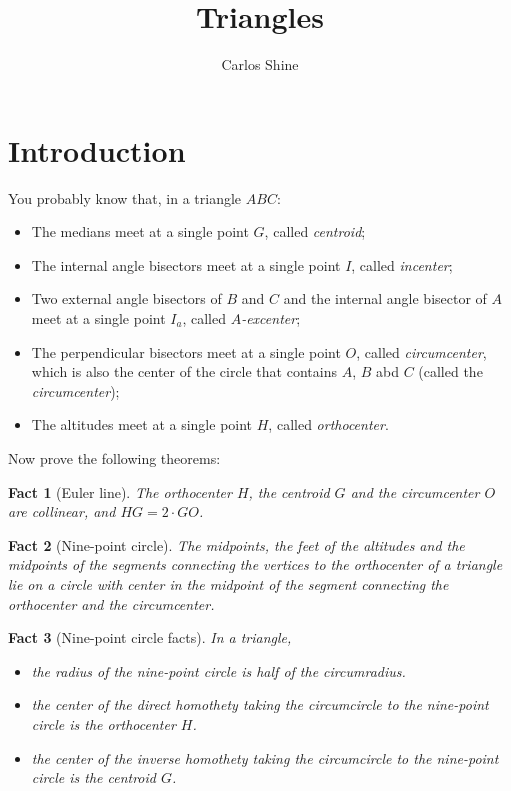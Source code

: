 \documentclass[10pt]{article}
\newtheorem{fact}{Fact}%
\theoremstyle{definition}
\theoremstyle{remark}
\begin{document}
\title{Triangles}
\author{Carlos Shine}
\date{}
\maketitle
\section{Introduction}
You probably know that, in a triangle $ABC$:
\begin{itemize}
\item The medians meet at a single point $G$, called \emph{centroid};
\item The internal angle bisectors meet at a single point $I$, called \emph{incenter};
\item Two external angle bisectors of $B$ and $C$ and the internal angle bisector of $A$ meet at a single point $I_a$, called \emph{$A$-excenter};
\item The perpendicular bisectors meet at a single point $O$, called \emph{circumcenter}, which is also the center of the circle that contains $A$, $B$ abd $C$ (called the \emph{circumcenter});
\item The altitudes meet at a single point $H$, called \emph{orthocenter}.
\end{itemize}

Now prove the following theorems:
\begin{fact}[Euler line]
The orthocenter $H$, the centroid $G$ and the circumcenter $O$ are collinear, and $HG = 2\cdot GO$.
\end{fact}

\begin{fact}[Nine-point circle]
The midpoints, the feet of the altitudes and the midpoints of the segments connecting the vertices to the orthocenter of a triangle lie on a circle with center in the midpoint of the segment connecting the orthocenter and the circumcenter.
\end{fact}

\begin{fact}[Nine-point circle facts]
In a triangle,
\begin{itemize}
\item the radius of the nine-point circle is half of the circumradius.
\item the center of the direct homothety taking the circumcircle to the nine-point circle is the orthocenter $H$.
\item the center of the inverse homothety taking the circumcircle to the nine-point circle is the centroid $G$.
\end{itemize}
\end{fact}
\end{document}
